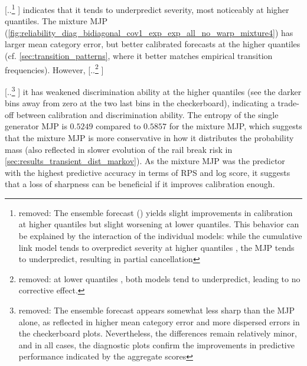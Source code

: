 \documentclass{article}
\providecommand{\DIFadd}[1]{{\protect\color{blue} \sf #1}} %
\providecommand{\DIFdel}[1]{{\protect\color{red} [..\footnote{removed: #1} ]}} %
\providecommand{\DIFaddbegin}{} %
\providecommand{\DIFaddend}{} %
\providecommand{\DIFdelbegin}{} %
\providecommand{\DIFdelend}{} %
\begin{document}
\DIFdel{The ensemble forecast (\Cref{fig:reliability_diag_ensemble_all}) yields slight improvements in calibration at higher quantiles but slight worsening at lower quantiles.
This behavior can be explained by the interaction of the individual models: while the cumulative link model tends to overpredict severity at higher quantiles , the MJP tends to underpredict, resulting in partial cancellation}\DIFdelend \DIFaddbegin \DIFadd{indicates that it tends to underpredict severity, most noticeably at higher quantiles.
The mixture MJP (\cref{fig:reliability_diag_bidiagonal_cov1_exp_exp_all_no_warp_mixture4}) has larger mean category error, but better calibrated forecasts at the higher quantiles (cf. \cref{sec:transition_patterns}, where it better matches empirical transition frequencies)}\DIFaddend . However, \DIFdelbegin \DIFdel{at lower quantiles , both models tend to underpredict, leading to no corrective effect.
}%

\DIFdel{The ensemble forecast appears somewhat less sharp than the MJP alone, as reflected in higher mean category error and more dispersed errors in the checkerboard plots.
Nevertheless, the differences remain relatively minor, and in all cases, the diagnostic plots confirm the improvements in predictive performance indicated by the aggregate scores}\DIFdelend \DIFaddbegin \DIFadd{it has weakened discrimination ability at the higher quantiles (see the darker bins away from zero at the two last bins in the checkerboard), indicating a trade-off between calibration and discrimination ability.
The entropy of the single generator MJP is $0.5249$ compared to $0.5857$ for the mixture MJP, which suggests that the mixture MJP is more conservative in how it distributes the probability mass (also reflected in slower evolution of the rail break risk in \cref{sec:results_transient_dist_markov}). As the mixture MJP was the predictor with the highest predictive accuracy in terms of RPS and log score, it suggests that a loss of sharpness can be beneficial if it improves calibration enough}\DIFaddend .



\DIFdelbegin %
\end{document}
